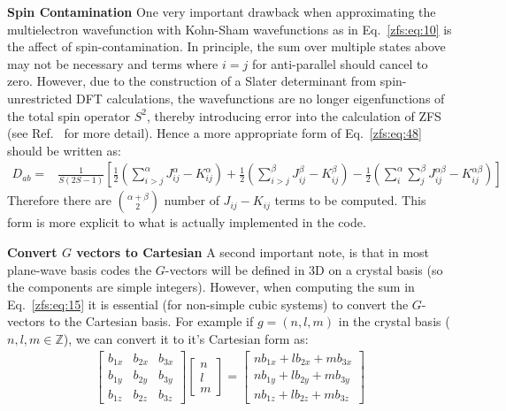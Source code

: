 \textbf{Spin Contamination} One very important drawback when approximating the multielectron wavefunction with Kohn-Sham wavefunctions as in Eq.~\ref{zfs:eq:10} is the affect of spin-contamination. In principle, the sum over multiple states above may not be necessary and terms where $i=j$ for anti-parallel should cancel to zero. However, due to the construction of a Slater determinant from spin-unrestricted DFT calculations, the wavefunctions are no longer eigenfunctions of the total spin operator $S^2$, thereby introducing error into the calculation of ZFS (see Ref.~\cite{biktagirov2018calculation} for more detail). Hence a more appropriate form of Eq.~\ref{zfs:eq:48} should be written as:
\begin{align}
    D_{ab}
    =&\frac{1}{S(2S-1)} \left[
        \frac{1}{2}(\sum_{i>j}^{\alpha}J_{ij}^{\alpha} - K_{ij}^{\alpha})
        +\frac{1}{2}(\sum_{i>j}^{\beta}J_{ij}^{\beta} - K_{ij}^{\beta})
        -\frac{1}{2}(\sum_{i}^{\alpha}\sum_{j}^{\beta}J_{ij}^{\alpha\beta}-K_{ij}^{\alpha\beta})
        \right]
\end{align}
Therefore there are $\binom{\alpha+\beta}{2}$ number of $J_{ij}-K_{ij}$ terms to be computed. This form is more explicit to what is actually implemented in the code.
\medskip

\textbf{Convert $G$ vectors to Cartesian} A second important note, is that in most plane-wave basis codes the $G$-vectors will be defined in 3D on a crystal basis (so the components are simple integers). However, when computing the sum in Eq.~\ref{zfs:eq:15} it is essential (for non-simple cubic systems) to convert the $G$-vectors to the Cartesian basis. For example if $g = (n,l,m)$ in the crystal basis ($n,l,m\in \mathbb{Z}$), we can convert it to it's Cartesian form as:
\begin{align}
    \begin{bmatrix}
        b_{1x} & b_{2x} & b_{3x} \\
        b_{1y} & b_{2y} & b_{3y} \\
        b_{1z} & b_{2z} & b_{3z}
    \end{bmatrix}
    \begin{bmatrix}
        n \\ l \\ m
    \end{bmatrix}
    =
    \begin{bmatrix}
        n b_{1x} + l b_{2x} + m b_{3x} \\
        n b_{1y} + l b_{2y} + m b_{3y} \\
        n b_{1z} + l b_{2z} + m b_{3z}
    \end{bmatrix}
\end{align}

